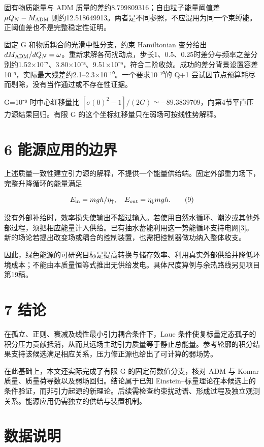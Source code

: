 \documentclass[UTF8,fontset=fandol,11pt]{ctexart}
\begin{document}
固有物质能量与 ADM 质量的差约8.799809316；自由粒子能量阈值差 \(\mu Q_N-M_{\rm ADM}\) 则约12.518649913。两者是不同参照，不应混用为同一个束缚能。正阈值差也不是完整稳定性证明。

固定 G 和物质耦合的光滑中性分支，约束 Hamiltonian 变分给出 \(dM_{\rm ADM}/dQ_N=\omega\)。重新求解各荷扰动点，步长1、0.5、0.25时差分与频率之差分别约1.52×10⁻⁷、3.80×10⁻⁸、9.51×10⁻⁹，符合二阶收敛。成功的差分背景设置容差10⁻⁹，实际最大残差约2.1–2.3×10⁻¹⁰。一个要求10⁻¹⁰的 Q+1 尝试因节点预算耗尽而剔除，没有当作通过或不存在性证据。

G=10⁻⁸ 时中心红移量比 \([\sigma(0)^2-1]/(2G)\simeq-89.3839709\)，向第4节平直压力源结果回归。有限 G 的这个坐标红移量只在弱场可按线性势解释。

\section*{6 能源应用的边界}

上述质量一致性建立引力源的解释，不提供一个能量供给端。固定外部重力场下，完整升降循环的能量满足

\[
E_{\rm in}=mgh/\eta_\uparrow,
\quad E_{\rm out}=\eta_\downarrow mgh.
\tag{9}
\]

没有外部补给时，效率损失使输出不超过输入。若使用自然水循环、潮汐或其他外部过程，须把相应能量计入供给。已有抽水蓄能利用这一势能循环支持电网[3]。新的场论若提出改变场或耦合的控制装置，也需把控制器做功纳入整体收支。

因此，绿色能源的可研究目标是提高转换与储存效率、利用真实外部供给并降低环境成本；不能由本质量恒等式推出无供给发电。具体尺度算例与余热路线另见项目第19稿。

\section*{7 结论}

在孤立、正则、衰减及线性最小引力耦合条件下，Laue 条件使复标量定态孤子的积分压力贡献抵消，从而其远场主动引力质量等于静止总能量。参考轮廓的积分结果支持该候选满足相应关系，压力修正源也给出了可计算的弱场势。

在此基础上，本文还实际完成了有限 G 的固定荷数值分支，核对 ADM 与 Komar 质量、质量荷导数以及弱场回归。结论属于已知 Einstein–标量理论在本候选上的条件验证，而非引力起源的新理论。后续需检查约束扰动谱、形成过程及独立观测关系。能源应用仍需独立的供给与装置机制。

\section*{数据说明}
\end{document}
